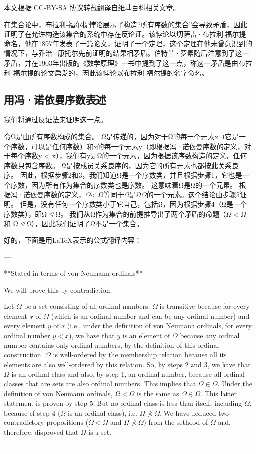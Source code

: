 
本文根据 CC-BY-SA 协议转载翻译自维基百科\href{https://en.wikipedia.org/wiki/Burali-Forti_paradox}{相关文章}。

在集合论中，布拉利-福尔提悖论展示了构造“所有序数的集合”会导致矛盾，因此证明了在允许构造该集合的系统中存在反论证。该悖论以切萨雷·布拉利-福尔提命名，他在1897年发表了一篇论文，证明了一个定理，这个定理在他未曾意识到的情况下，与乔治·康托尔先前证明的结果相矛盾。伯特兰·罗素随后注意到了这一矛盾，并在1903年出版的《数学原理》一书中提到了这一点，称这一矛盾是由布拉利-福尔提的论文启发的，因此该悖论以布拉利-福尔提的名字命名。
\subsection{用冯·诺依曼序数表述}
我们将通过反证法来证明这一点。

令Ω是由所有序数构成的集合。
$\Omega$是传递的，因为对于Ω的每一个元素x（它是一个序数，可以是任何序数）和x的每一个元素y（即根据冯·诺依曼序数的定义，对于每个序数y < x），我们有y是Ω的一个元素，因为根据该序数构造的定义，任何序数只包含序数。
Ω是按成员关系良序的，因为它的所有元素也都按此关系良序。
因此，根据步骤2和3，我们知道Ω是一个序数类，并且根据步骤1，它也是一个序数，因为所有作为集合的序数类也是序数。
这意味着Ω是Ω的一个元素。
根据冯·诺依曼序数的定义，$\Omega$< $\Omega$等同于$\Omega$是Ω$\Omega$的一个元素。这个结论由步骤5证明。
但是，没有任何一个序数类小于它自己，包括Ω，因为根据步骤4（Ω是一个序数类），即Ω ≮ Ω。
我们从Ω作为集合的前提推导出了两个矛盾的命题（$\Omega< \Omega$ 和 Ω ≮ Ω），因此我们证明了Ω不是一个集合。



好的，下面是用LaTeX表示的公式翻译内容：

---

**Stated in terms of von Neumann ordinals**

We will prove this by contradiction.

Let $\Omega$ be a set consisting of all ordinal numbers.
$\Omega$ is transitive because for every element $x$ of $\Omega$ (which is an ordinal number and can be any ordinal number) and every element $y$ of $x$ (i.e., under the definition of von Neumann ordinals, for every ordinal number $y < x$), we have that $y$ is an element of $\Omega$ because any ordinal number contains only ordinal numbers, by the definition of this ordinal construction.
$\Omega$ is well-ordered by the membership relation because all its elements are also well-ordered by this relation.
So, by steps 2 and 3, we have that $\Omega$ is an ordinal class and also, by step 1, an ordinal number, because all ordinal classes that are sets are also ordinal numbers.
This implies that $\Omega \in \Omega$.
Under the definition of von Neumann ordinals, $\Omega < \Omega$ is the same as $\Omega \in \Omega$. This latter statement is proven by step 5.
But no ordinal class is less than itself, including $\Omega$, because of step 4 ($\Omega$ is an ordinal class), i.e. $\Omega \not\prec \Omega$.
We have deduced two contradictory propositions ($\Omega < \Omega$ and $\Omega \not\prec \Omega$) from the sethood of $\Omega$ and, therefore, disproved that $\Omega$ is a set.

---
